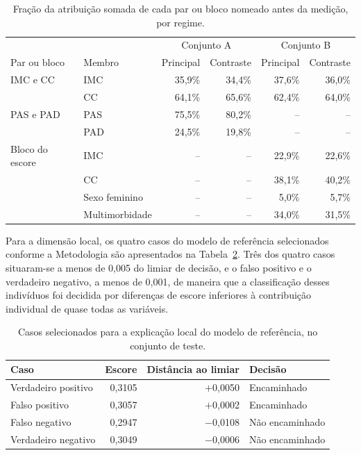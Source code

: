 \begin{table}[htb]
  \centering
  \caption{\label{tab:shap-blocos}Fração da atribuição somada de cada par ou bloco nomeado antes da medição, por regime.}
  \small
  \begin{tabular}{llrrrr}
    \hline
    & & \multicolumn{2}{c}{Conjunto A} & \multicolumn{2}{c}{Conjunto B} \\
    Par ou bloco & Membro & Principal & Contraste & Principal & Contraste \\ \hline
    IMC e CC & IMC & 35,9\% & 34,4\% & 37,6\% & 36,0\% \\
             & CC & 64,1\% & 65,6\% & 62,4\% & 64,0\% \\ \hline
    PAS e PAD & PAS & 75,5\% & 80,2\% & -- & -- \\
              & PAD & 24,5\% & 19,8\% & -- & -- \\ \hline
    Bloco do escore & IMC & -- & -- & 22,9\% & 22,6\% \\
                    & CC & -- & -- & 38,1\% & 40,2\% \\
                    & Sexo feminino & -- & -- & 5,0\% & 5,7\% \\
                    & Multimorbidade & -- & -- & 34,0\% & 31,5\% \\ \hline
  \end{tabular}
\end{table}

Para a dimensão local, os quatro casos do modelo de referência selecionados conforme a Metodologia são apresentados na Tabela~\ref{tab:shap-casos}. Três dos quatro casos situaram-se a menos de 0,005 do limiar de decisão, e o falso positivo e o verdadeiro negativo, a menos de 0,001, de maneira que a classificação desses indivíduos foi decidida por diferenças de escore inferiores à contribuição individual de quase todas as variáveis.

\begin{table}[htb]
  \centering
  \caption{\label{tab:shap-casos}Casos selecionados para a explicação local do modelo de referência, no conjunto de teste.}
  \begin{tabular}{lrrl}
    \hline
    Caso & Escore & Distância ao limiar & Decisão \\ \hline
    Verdadeiro positivo & 0,3105 & $+$0,0050 & Encaminhado \\
    Falso positivo & 0,3057 & $+$0,0002 & Encaminhado \\
    Falso negativo & 0,2947 & $-$0,0108 & Não encaminhado \\
    Verdadeiro negativo & 0,3049 & $-$0,0006 & Não encaminhado \\ \hline
  \end{tabular}
\end{table}

